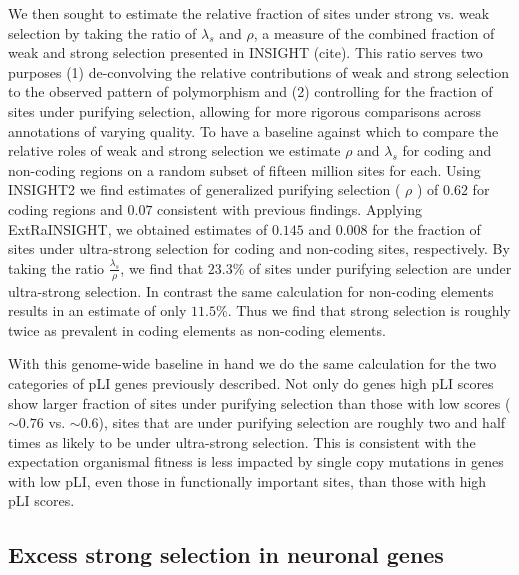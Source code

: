 \documentclass[11pt]{article}
\begin{document}
We then sought to estimate the relative fraction of sites under strong vs. weak selection by taking the ratio of $\lambda_s$ and $\rho$, a measure of the combined fraction of weak and strong selection presented in INSIGHT (cite). This ratio serves two purposes (1) de-convolving the relative contributions of weak and strong selection to the observed pattern of polymorphism and (2) controlling for the fraction of sites under purifying selection, allowing for more rigorous comparisons across annotations of varying quality. To have a baseline against which to compare the relative roles of weak and strong selection we estimate $\rho$ and $\lambda_s$ for coding and non-coding regions on a random subset of fifteen million sites for each. Using INSIGHT2 we find estimates of generalized purifying selection ( $\rho$ ) of $0.62$ for coding regions and $0.07$ consistent with previous findings. Applying ExtRaINSIGHT, we obtained estimates of $0.145$ and $0.008$ for the fraction of sites under ultra-strong selection for coding and non-coding sites, respectively. By taking the ratio $\frac{\lambda_s}{\rho}$, we find that $23.3\%$ of sites under purifying selection are under ultra-strong selection. In contrast the same calculation for non-coding elements results in an estimate of only $11.5\%$. Thus we find that strong selection is roughly twice as prevalent in coding elements as non-coding elements.

With this genome-wide baseline in hand we do the same calculation for the two categories of pLI genes previously described. Not only do genes high pLI scores show larger fraction of sites under purifying selection than those with low scores ($\sim 0.76$ vs. $\sim 0.6$), sites that are under purifying selection are roughly two and half times as likely to be under ultra-strong selection. This is consistent with the expectation organismal fitness is less impacted by single copy mutations in genes with low pLI, even those in functionally important sites, than those with high pLI scores.

\subsection*{Excess strong selection in neuronal genes}
\end{document}
